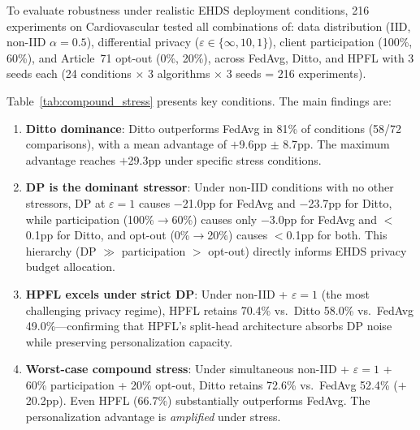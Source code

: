 \documentclass[conference]{IEEEtran}
\begin{document}
To evaluate robustness under realistic EHDS deployment conditions, 216 experiments on Cardiovascular tested all combinations of: data distribution (IID, non-IID $\alpha{=}0.5$), differential privacy ($\varepsilon \in \{\infty, 10, 1\}$), client participation (100\%, 60\%), and Article~71 opt-out (0\%, 20\%), across FedAvg, Ditto, and HPFL with 3 seeds each (24 conditions $\times$ 3 algorithms $\times$ 3 seeds = 216 experiments).

Table~\ref{tab:compound_stress} presents key conditions. The main findings are:

\begin{enumerate}
    \item \textbf{Ditto dominance}: Ditto outperforms FedAvg in 81\% of conditions (58/72 comparisons), with a mean advantage of $+$9.6pp $\pm$ 8.7pp. The maximum advantage reaches $+$29.3pp under specific stress conditions.

    \item \textbf{DP is the dominant stressor}: Under non-IID conditions with no other stressors, DP at $\varepsilon{=}1$ causes $-$21.0pp for FedAvg and $-$23.7pp for Ditto, while participation (100\%$\to$60\%) causes only $-$3.0pp for FedAvg and $<$0.1pp for Ditto, and opt-out (0\%$\to$20\%) causes $<$0.1pp for both. This hierarchy (DP $\gg$ participation $>$ opt-out) directly informs EHDS privacy budget allocation.

    \item \textbf{HPFL excels under strict DP}: Under non-IID + $\varepsilon{=}1$ (the most challenging privacy regime), HPFL retains 70.4\% vs.\ Ditto 58.0\% vs.\ FedAvg 49.0\%---confirming that HPFL's split-head architecture absorbs DP noise while preserving personalization capacity.

    \item \textbf{Worst-case compound stress}: Under simultaneous non-IID + $\varepsilon{=}1$ + 60\% participation + 20\% opt-out, Ditto retains 72.6\% vs.\ FedAvg 52.4\% ($+$20.2pp). Even HPFL (66.7\%) substantially outperforms FedAvg. The personalization advantage is \textit{amplified} under stress.
\end{enumerate}
\end{document}
